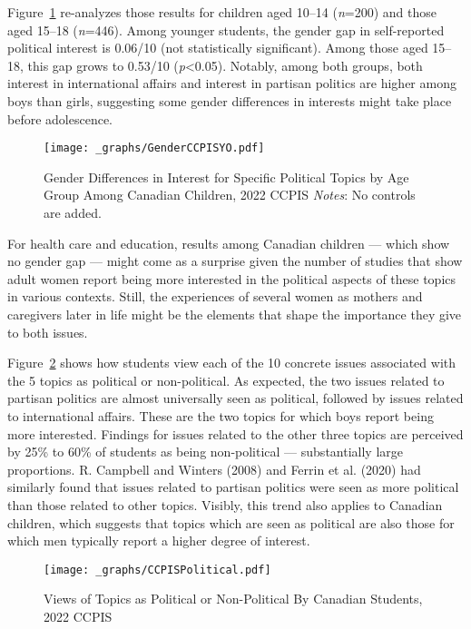 \documentclass[
  letterpaper,
  DIV=11,
  numbers=noendperiod]{scrreprt}
\begin{document}
Figure~\ref{fig-interestyoungold} re-analyzes those results for children
aged 10--14 (\emph{n}=200) and those aged 15--18 (\emph{n}=446). Among
younger students, the gender gap in self-reported political interest is
0.06/10 (not statistically significant). Among those aged 15--18, this
gap grows to 0.53/10 (\emph{p}\textless0.05). Notably, among both
groups, both interest in international affairs and interest in partisan
politics are higher among boys than girls, suggesting some gender
differences in interests might take place before adolescence.

\begin{figure}

{\centering \texttt{[image: \_graphs/GenderCCPISYO.pdf]}

}

\caption{\label{fig-interestyoungold}Gender Differences in Interest for
Specific Political Topics by Age Group Among Canadian Children, 2022
CCPIS \newline \textit{Notes}: No controls are added.}

\end{figure}

For health care and education, results among Canadian children --- which
show no gender gap --- might come as a surprise given the number of
studies that show adult women report being more interested in the
political aspects of these topics in various contexts. Still, the
experiences of several women as mothers and caregivers later in life
might be the elements that shape the importance they give to both
issues.

Figure~\ref{fig-political} shows how students view each of the 10
concrete issues associated with the 5 topics as political or
non-political. As expected, the two issues related to partisan politics
are almost universally seen as political, followed by issues related to
international affairs. These are the two topics for which boys report
being more interested. Findings for issues related to the other three
topics are perceived by 25\% to 60\% of students as being non-political
--- substantially large proportions. R. Campbell and Winters (2008) and
Ferrin et al. (2020) had similarly found that issues related to partisan
politics were seen as more political than those related to other topics.
Visibly, this trend also applies to Canadian children, which suggests
that topics which are seen as political are also those for which men
typically report a higher degree of interest.

\begin{figure}

{\centering \texttt{[image: \_graphs/CCPISPolitical.pdf]}

}

\caption{\label{fig-political}Views of Topics as Political or
Non-Political By Canadian Students, 2022 CCPIS}

\end{figure}
\end{document}
